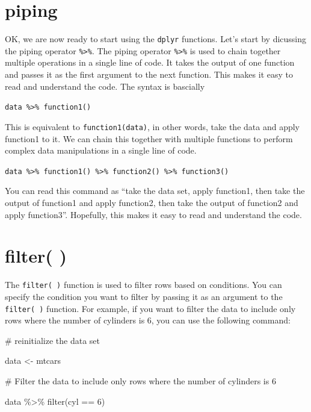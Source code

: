 \documentclass[
  letterpaper,
  DIV=11,
  numbers=noendperiod]{scrreprt}
\newenvironment{Shaded}{\begin{snugshade}}{\end{snugshade}}
\newcommand{\CommentTok}[1]{\textcolor[rgb]{0.37,0.37,0.37}{#1}}
\newcommand{\DecValTok}[1]{\textcolor[rgb]{0.68,0.00,0.00}{#1}}
\newcommand{\FunctionTok}[1]{\textcolor[rgb]{0.28,0.35,0.67}{#1}}
\newcommand{\NormalTok}[1]{\textcolor[rgb]{0.00,0.23,0.31}{#1}}
\newcommand{\OtherTok}[1]{\textcolor[rgb]{0.00,0.23,0.31}{#1}}
\newcommand{\SpecialCharTok}[1]{\textcolor[rgb]{0.37,0.37,0.37}{#1}}
\begin{document}
\section*{piping}\label{piping}


OK, we are now ready to start using the \texttt{dplyr} functions. Let's
start by dicussing the piping operator \texttt{\%\textgreater{}\%}. The
piping operator \texttt{\%\textgreater{}\%} is used to chain together
multiple operations in a single line of code. It takes the output of one
function and passes it as the first argument to the next function. This
makes it easy to read and understand the code. The syntax is bascially

\texttt{data\ \%\textgreater{}\%\ function1()}

This is equivalent to \texttt{function1(data)}, in other words, take the
data and apply function1 to it. We can chain this together with multiple
functions to perform complex data manipulations in a single line of
code.

\texttt{data\ \%\textgreater{}\%\ function1()\ \%\textgreater{}\%\ function2()\ \%\textgreater{}\%\ function3()}

You can read this command as ``take the data set, apply function1, then
take the output of function1 and apply function2, then take the output
of function2 and apply function3''. Hopefully, this makes it easy to
read and understand the code.

\section*{filter( )}\label{filter}


The \texttt{filter(\ )} function is used to filter rows based on
conditions. You can specify the condition you want to filter by passing
it as an argument to the \texttt{filter(\ )} function. For example, if
you want to filter the data to include only rows where the number of
cylinders is 6, you can use the following command:

\begin{Shaded}
\begin{Highlighting}[]
\CommentTok{\# reinitialize the data set}

\NormalTok{data }\OtherTok{\textless{}{-}}\NormalTok{ mtcars}

\CommentTok{\# Filter the data to include only rows where the number of cylinders is 6}

\NormalTok{data }\SpecialCharTok{\%\textgreater{}\%}
  \FunctionTok{filter}\NormalTok{(cyl }\SpecialCharTok{==} \DecValTok{6}\NormalTok{)}
\end{Highlighting}
\end{Shaded}
\end{document}
